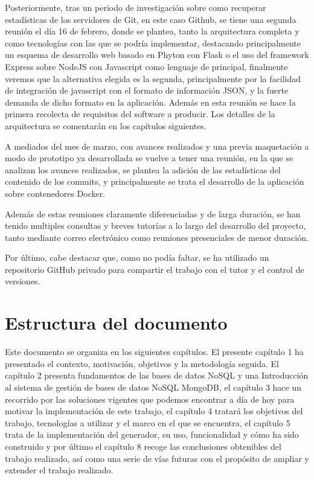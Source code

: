 Posteriormente, tras un periodo de investigación sobre como recuperar
estadísticas de los servidores de Git, en este caso Github, se tiene una
segunda reunión el día 16 de febrero, donde se plantea, tanto la
arquitectura completa y como tecnologías con las que se podría implementar,
destacando principalmente un esquema de desarrollo web basado en Phyton con
Flask o el uso del framework Express sobre NodeJS con Javascript como
lenguaje de principal, finalmente veremos que la alternativa elegida es la
segunda, principalmente por la facilidad de integración de javascript con
el formato de información JSON, y la fuerte demanda de dicho formato en la
aplicación. Además en esta reunión se hace la primera recolecta de
requisitos del software a producir. Los detalles de la arquitectura se
comentarán en los capítulos siguientes.

A mediados del mes de marzo, con avances realizados y una previa
maquetación a modo de prototipo ya desarrollada se vuelve a tener una
reunión, en la que se analizan los avances realizados, se plantea la
adición de las estadísticas del contenido de los commits, y principalmente
se trata el desarrollo de la aplicación sobre contenedores Docker.

Además de estas reuniones claramente diferenciadas y de larga duración, se
han tenido multiples consultas y breves tutorías a lo largo del desarrollo
del proyecto, tanto mediante correo electrónico como reuniones presenciales
de menor duración.

Por último, cabe destacar que, como no podía faltar, se ha utilizado un
repositorio GitHub privado para compartir el trabajo con el tutor y el
control de versiones.

\section{Estructura del documento}

Este documento se organiza en los siguientes capítulos. El presente
capítulo 1 ha presentado el contexto, motivación, objetivos y la
metodología seguida. El capítulo 2 presenta fundamentos de las bases de
datos NoSQL y una Introducción al sistema de gestión de bases de datos
NoSQL MongoDB, el capítulo 3 hace un recorrido por las soluciones vigentes
que podemos encontrar a día de hoy para motivar la implementación de este
trabajo, el capítulo 4 tratará los objetivos del trabajo, tecnologías a
utilizar y el marco en el que se encuentra, el capítulo 5 trata de la
implementación del generador, su uso, funcionalidad y cómo ha sido
construido y por último el capítulo 8 recoge las conclusiones obtenibles
del trabajo realizado, así como una serie de vías futuras con el propósito
de ampliar y extender el trabajo realizado.

